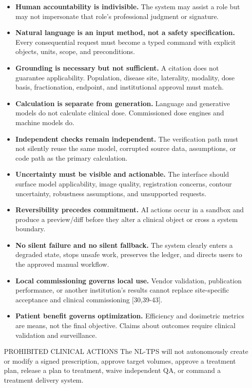 \documentclass[11pt,letterpaper]{article}
\begin{document}
\begin{itemize}
\item \textbf{Human accountability is indivisible.} The system may assist a role but may not impersonate that role's professional judgment or signature.
\item \textbf{Natural language is an input method, not a safety specification.} Every consequential request must become a typed command with explicit objects, units, scope, and preconditions.
\item \textbf{Grounding is necessary but not sufficient.} A citation does not guarantee applicability. Population, disease site, laterality, modality, dose basis, fractionation, endpoint, and institutional approval must match.
\item \textbf{Calculation is separate from generation.} Language and generative models do not calculate clinical dose. Commissioned dose engines and machine models do.
\item \textbf{Independent checks remain independent.} The verification path must not silently reuse the same model, corrupted source data, assumptions, or code path as the primary calculation.
\item \textbf{Uncertainty must be visible and actionable.} The interface should surface model applicability, image quality, registration concerns, contour uncertainty, robustness assumptions, and unsupported requests.
\item \textbf{Reversibility precedes commitment.} AI actions occur in a sandbox and produce a preview\slash\allowbreak{}diff before they alter a clinical object or cross a system boundary.
\item \textbf{No silent failure and no silent fallback.} The system clearly enters a degraded state, stops unsafe work, preserves the ledger, and directs users to the approved manual workflow.
\item \textbf{Local commissioning governs local use.} Vendor validation, publication performance, or another institution's results cannot replace site-specific acceptance and clinical commissioning [30,39-43].
\item \textbf{Patient benefit governs optimization.} Efficiency and dosimetric metrics are means, not the final objective. Claims about outcomes require clinical validation and surveillance.
\end{itemize}

\begin{nlnotice}{PROHIBITED CLINICAL ACTIONS}
The NL-TPS will not autonomously create or modify a signed prescription, approve target volumes, approve a treatment plan, release a plan to treatment, waive independent QA, or command a treatment delivery system.
\end{nlnotice}
\end{document}

